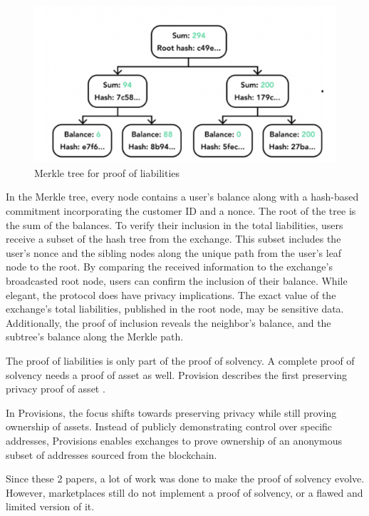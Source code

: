 \begin{figure}[H]
\centering
\includegraphics[width=130mm]{MerkleTreeLiabilities.png}
\caption{Merkle tree for proof of liabilities}
\label{overflow}
\end{figure}


In the Merkle tree, every node contains a user's balance along with a hash-based commitment incorporating the customer ID and a nonce. The root of the tree is the sum of the balances.
To verify their inclusion in the total liabilities, users receive a subset of the hash tree from the exchange. This subset includes the user's nonce and the sibling nodes along the unique path from the user's leaf node to the root.
By comparing the received information to the exchange's broadcasted root node, users can confirm the inclusion of their balance.
While elegant, the protocol does have privacy implications. The exact value of the exchange's total liabilities, published in the root node, may be sensitive data.
Additionally, the proof of inclusion reveals the neighbor's balance, and the subtree's balance along the Merkle path.

The proof of liabilities is only part of the proof of solvency. A complete proof of solvency needs a proof of asset as well.
Provision describes the first preserving privacy proof of asset \cite{DBBBCC15}.

In Provisions, the focus shifts towards preserving privacy while still proving ownership of assets.
Instead of publicly demonstrating control over specific addresses, Provisions enables exchanges to prove ownership of an anonymous subset of addresses sourced from the blockchain.

Since these 2 papers, a lot of work was done to make the proof of solvency evolve. However, marketplaces still do not implement a proof of solvency, or a flawed and limited version of it.


